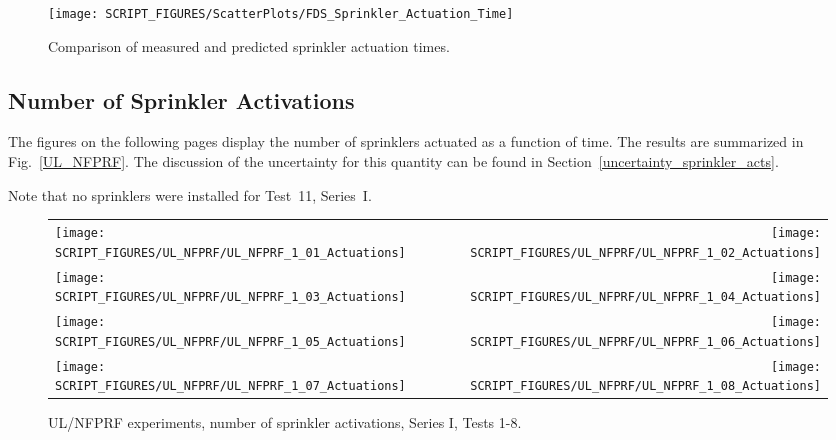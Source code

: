 \begin{figure}[h]
\begin{center}
\texttt{[image: SCRIPT\_FIGURES/ScatterPlots/FDS\_Sprinkler\_Actuation\_Time]}
\end{center}
\caption[Comparison of measured and predicted sprinkler actuation times]{Comparison of measured and predicted sprinkler actuation times.}
\label{Sprinkler_Activation_Times}
\end{figure}


\clearpage

\subsection{Number of Sprinkler Activations}
\label{UL_NFPRF:Results}
\label{Sprinkler Actuations}

The figures on the following pages display the number of sprinklers actuated as a function of time. The results are summarized in Fig.~\ref{UL_NFPRF}. The discussion of the uncertainty for this quantity can be found in Section~\ref{uncertainty_sprinkler_acts}.

Note that no sprinklers were installed for Test~11, Series~I.

\newpage

\begin{figure}[p]
\begin{tabular*}{\textwidth}{l@{\extracolsep{\fill}}r}
\texttt{[image: SCRIPT\_FIGURES/UL\_NFPRF/UL\_NFPRF\_1\_01\_Actuations]} &
\texttt{[image: SCRIPT\_FIGURES/UL\_NFPRF/UL\_NFPRF\_1\_02\_Actuations]} \\
\texttt{[image: SCRIPT\_FIGURES/UL\_NFPRF/UL\_NFPRF\_1\_03\_Actuations]} &
\texttt{[image: SCRIPT\_FIGURES/UL\_NFPRF/UL\_NFPRF\_1\_04\_Actuations]} \\
\texttt{[image: SCRIPT\_FIGURES/UL\_NFPRF/UL\_NFPRF\_1\_05\_Actuations]} &
\texttt{[image: SCRIPT\_FIGURES/UL\_NFPRF/UL\_NFPRF\_1\_06\_Actuations]} \\
\texttt{[image: SCRIPT\_FIGURES/UL\_NFPRF/UL\_NFPRF\_1\_07\_Actuations]} &
\texttt{[image: SCRIPT\_FIGURES/UL\_NFPRF/UL\_NFPRF\_1\_08\_Actuations]} \\
\end{tabular*}
\caption{UL/NFPRF experiments, number of sprinkler activations, Series I, Tests 1-8.}
\label{UL_NFPRF_1}
\end{figure}

